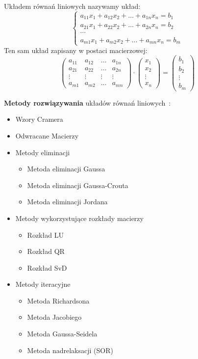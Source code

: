\documentclass[wi]{zut}
\begin{document}
Układem równań liniowych nazywamy układ:
$$
\left\{\begin{array}{l}
a_{11} x_{1}+a_{12} x_{2}+\ldots+a_{1 n} x_{n}=b_{1} \\
a_{21} x_{1}+a_{22} x_{2}+\ldots+a_{2 n} x_{n}=b_{2} \\
\cdots \\
a_{m 1} x_{1}+a_{m 2} x_{2}+\ldots+a_{m n} x_{n}=b_{m}
\end{array}\right.
$$
Ten sam układ zapisany w postaci macierzowej:
$$
\left(\begin{array}{cccc}
a_{11} & a_{12} & \ldots & a_{1 n} \\
a_{21} & a_{22} & \ldots & a_{2 n} \\
\vdots & \vdots & \vdots & \vdots \\
a_{m 1} & a_{m 2} & \ldots & a_{m n}
\end{array}\right) \cdot\left(\begin{array}{c}
x_{1} \\
x_{2} \\
\vdots \\
x_{n}
\end{array}\right)=\left(\begin{array}{c}
b_{1} \\
b_{2} \\
\vdots \\
b_{m}
\end{array}\right)
$$

\textbf{Metody rozwiązywania} układów równań liniowych~\cite{Piela_URL}:

\begin{itemize}
    \item Wzory Cramera
    \item Odwracane Macierzy
    \item Metody eliminacji
    \begin{itemize}
        \item Metoda eliminacji Gaussa
        \item Metoda eliminacji Gaussa-Crouta
        \item Metoda eliminacji Jordana
    \end{itemize}
    \item Metody wykorzystujące rozkłady macierzy
    \begin{itemize}
        \item Rozkład LU
        \item Rozkład QR
        \item Rozkład SvD
    \end{itemize}
    \item Metody iteracyjne
    \begin{itemize}
        \item Metoda Richardsona
        \item Metoda Jacobiego
        \item Metoda Gaussa-Seidela
        \item Metoda nadrelaksacji (SOR)
    \end{itemize}
\end{itemize}
\end{document}
